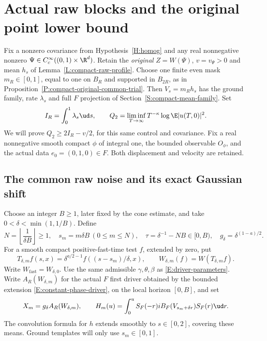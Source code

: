 \section{Actual raw blocks and the original point lower bound}
\label{S:actual-raw-block-lower}

Fix a nonzero covariance from Hypothesis~\ref{H:homog} and any real
nonnegative nonzero $\Psi\in C_c^\infty((0,1)\times\R^d)$.
Retain the \emph{original} $Z=W(\Psi)$, $v=v_\Psi>0$ and mean $h_s$
of Lemma~\ref{L:compact-raw-profile}. Choose one finite even mask
$m_R\in[0,1]$, equal to one on $B_R$ and supported in $B_{2R}$,
as in Proposition~\ref{P:compact-original-common-trial}.
Then $V_s=m_Rh_s$ has the ground family, rate $\lambda_s$ and full
$F$ projection of Section~\ref{S:compact-mean-family}. Set
\[
  I_R=\int_0^1\lambda_s\ud s,\qquad
  Q_2=\liminf_{T\to\infty}T^{-\kappa}\log\E|u(T,0)|^2.
\]
We will prove $Q_2\ge2I_R-v/2$, for this same control and covariance.
Fix a real nonnegative smooth compact $\phi$ of integral one, the
bounded observable $O_\phi$, and the actual data $e_0=(0,1,0)\in F$.
Both displacement and velocity are retained.

\subsection{The common raw noise and its exact Gaussian shift}

Choose an integer $B\ge1$, later fixed by the cone estimate, and take
$0<\delta<\min(1,1/B)$. Define
\begin{equation}\label{E:raw-block-clocks}
  N=\left\lfloor\frac1{\delta B}\right\rfloor\ge1,\quad
  s_m=m\delta B\ (0\le m\le N),\quad
  \tau=\delta^{-1}-NB\in[0,B),\quad
  g_\delta=\delta^{(1-a)/2}.
\end{equation}
For a smooth compact positive-fast-time test $f$, extended by zero,
put
\begin{equation}\label{E:raw-block-pullback}
  T_{\delta,m}f(s,x)
  =\delta^{a/2-1}f((s-s_m)/\delta,x),\qquad
  W_{\delta,m}(f)=W(T_{\delta,m}f).
\end{equation}
Write $W_{\mathrm{fast}}=W_{\delta,0}$.
Use the same admissible $\gamma,\theta,\beta$ as
\eqref{E:driver-parameters}. Write $A_R(W_{\delta,m})$ for the
actual $F$ first driver obtained by the bounded extension
\eqref{E:constant-phase-driver}, on the local horizon $[0,B]$, and set
\begin{equation}\label{E:raw-block-drivers}
  X_m=g_\delta A_R(W_{\delta,m}),\qquad
  H_m(u)=\int_0^uS_F(-r)iB_F(V_{s_m+\delta r})S_F(r)\ud r.
\end{equation}
The convolution formula for $h$ extends smoothly to $s\in[0,2]$,
covering these means. Ground templates will only use $s_m\in[0,1]$.

